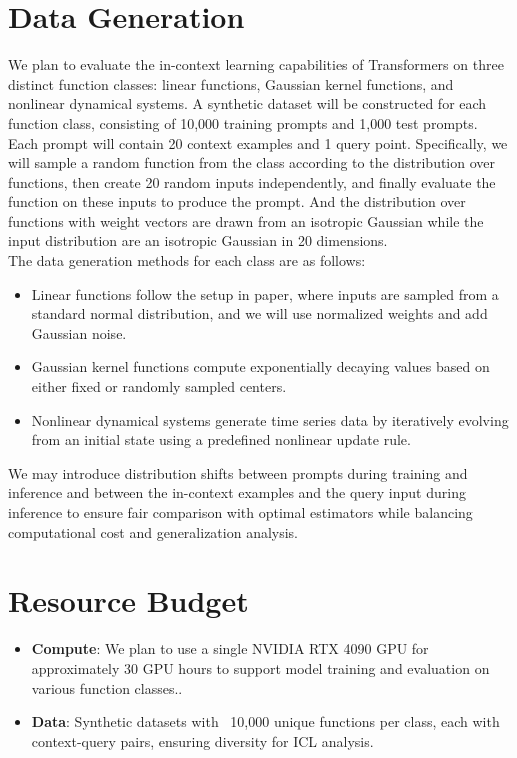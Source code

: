 \section*{Data Generation}

We plan to evaluate the in-context learning capabilities of Transformers on three distinct function classes: linear functions, Gaussian kernel functions, and nonlinear dynamical systems. A synthetic dataset will be constructed for each function class, consisting of 10,000 training prompts and 1,000 test prompts. Each prompt will contain 20 context examples and 1 query point. 
Specifically, we will sample a random function from the class according to the distribution over functions, then create 20 random inputs independently, and finally evaluate the function on these inputs to produce the prompt. 
And the distribution over functions with weight vectors are drawn from an isotropic Gaussian while the input distribution are an isotropic Gaussian in 20 dimensions.
\\The data generation methods for each class are as follows: 
\begin{itemize}
    \item Linear functions follow the setup in paper\cite{garg2023transformerslearnincontextcase}, where inputs are sampled from a standard normal distribution, and we will use normalized weights and add Gaussian noise.
    \item Gaussian kernel functions compute exponentially decaying values based on either fixed or randomly sampled centers. 
    \item Nonlinear dynamical systems generate time series data by iteratively evolving from an initial state using a predefined nonlinear update rule. 
\end{itemize}
\noindent We may introduce distribution shifts between prompts during training and inference and between the in-context examples and the query input during inference to ensure fair comparison with optimal estimators while balancing computational cost and generalization analysis.

\section*{Resource Budget}
\begin{itemize}
    \item \textbf{Compute}:
 We plan to use a single NVIDIA RTX 4090 GPU for approximately 30 GPU hours to support model training and evaluation on various function classes..
    \item \textbf{Data}:
 Synthetic datasets with ~10,000 unique functions per class, each with context-query pairs, ensuring diversity for ICL analysis.
\end{itemize}
